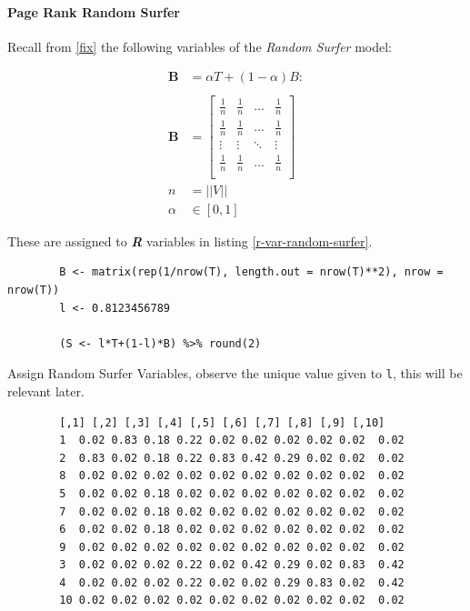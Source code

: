 \documentclass[11pt]{report}
\begin{document}
\paragraph{Page Rank Random Surfer}
\label{page-rank-random-surfer}
Recall from \ref{fix} the following variables of the \emph{Random Surfer} model:


\begin{align}
    \mathbf{B} &= \alpha T +  \left( 1- \alpha \right)B :\\
\ \\
    \mathbf{B}&= \begin{bmatrix}
    \frac{1}{n} & \frac{1}{n} & \ldots & \frac{1}{n} \\
    \frac{1}{n} & \frac{1}{n} & \ldots & \frac{1}{n} \\
        \vdots      & \vdots      & \ddots & \vdots  \\
    \frac{1}{n} & \frac{1}{n} & \ldots & \frac{1}{n} \\
    \end{bmatrix} \label{eq:bgval1} \\
    n&= \left| \left| V \right| \right| \\
    \alpha &\in [0,1]
\end{align}

These are
assigned to \emph{\textbf{R}} variables in listing \ref{r-var-random-surfer}.

\begin{listing}[htbp]
    \begin{tcolorbox}
        \begin{verbatim}
        B <- matrix(rep(1/nrow(T), length.out = nrow(T)**2), nrow = nrow(T))
        l <- 0.8123456789

        (S <- l*T+(1-l)*B) %>% round(2)
        \end{verbatim}
        \caption{\label{r-var-random-surfer}Assign Random Surfer Variables, observe the unique value given to \texttt{l}, this will be relevant later.}
    \tcblower
        \begin{verbatim}
        [,1] [,2] [,3] [,4] [,5] [,6] [,7] [,8] [,9] [,10]
        1  0.02 0.83 0.18 0.22 0.02 0.02 0.02 0.02 0.02  0.02
        2  0.83 0.02 0.18 0.22 0.83 0.42 0.29 0.02 0.02  0.02
        8  0.02 0.02 0.02 0.02 0.02 0.02 0.02 0.02 0.02  0.02
        5  0.02 0.02 0.18 0.02 0.02 0.02 0.02 0.02 0.02  0.02
        7  0.02 0.02 0.18 0.02 0.02 0.02 0.02 0.02 0.02  0.02
        6  0.02 0.02 0.18 0.02 0.02 0.02 0.02 0.02 0.02  0.02
        9  0.02 0.02 0.02 0.02 0.02 0.02 0.02 0.02 0.02  0.02
        3  0.02 0.02 0.02 0.22 0.02 0.42 0.29 0.02 0.83  0.42
        4  0.02 0.02 0.02 0.22 0.02 0.02 0.29 0.83 0.02  0.42
        10 0.02 0.02 0.02 0.02 0.02 0.02 0.02 0.02 0.02  0.02
        \end{verbatim}
    \end{tcolorbox}
\end{listing}
\end{document}

